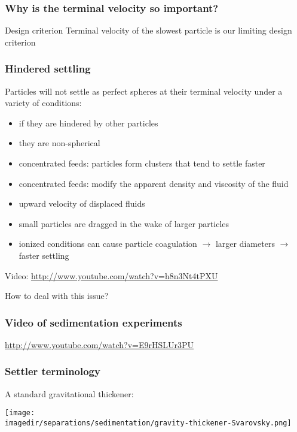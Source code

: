 \begin{frame}\frametitle{Why is the terminal velocity so important?}
	\begin{exampleblock}{Design criterion}
		Terminal velocity of the slowest particle is our limiting design criterion
	\end{exampleblock}
\end{frame}

\begin{frame}\frametitle{Hindered settling}
	Particles will not settle as perfect spheres at their terminal velocity under a variety of conditions:
	\begin{itemize}
		\item	if they are hindered by other particles
		\item	they are non-spherical
		\item	concentrated feeds: particles form clusters that tend to settle faster
		\item	concentrated feeds: modify the apparent density and viscosity of the fluid
		\item	upward velocity of displaced fluids
		\item	small particles are dragged in the wake of larger particles
		\item	ionized conditions can cause particle coagulation $\rightarrow$ larger diameters $\rightarrow$ faster settling
	\end{itemize}
	
	\vspace{12pt}
	Video: \href{http://www.youtube.com/watch?v=h8n3Nt4tPXU}{http://www.youtube.com/watch?v=h8n3Nt4tPXU}
	
	How to deal with this issue?
\end{frame}

\begin{frame}\frametitle{Video of sedimentation experiments}
	\href{http://www.youtube.com/watch?v=E9rHSLUr3PU}{http://www.youtube.com/watch?v=E9rHSLUr3PU}
\end{frame}

%

\begin{frame}\frametitle{Settler terminology}
	A standard gravitational thickener:
	
	\begin{center}
		\texttt{[image: \\imagedir/separations/sedimentation/gravity-thickener-Svarovsky.png]}
	\end{center}
\end{frame}

